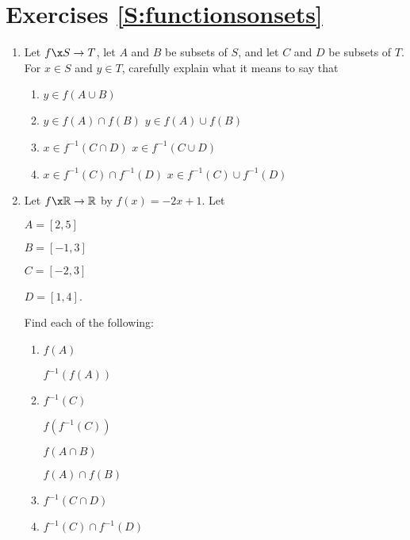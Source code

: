 \section*{Exercises \ref{S:functionsonsets}}

\begin{enumerate}
\item Let $f\x S \to T$, let $A$ and $B$ be subsets of $S$, and let $C$ and $D$ be subsets of $T$.  For $x \in S$ and $y \in T$, carefully explain what it means to say that \label{exer:sec91-1}

\begin{multicols}{2}
\begin{enumerate}
\yitem $y \in f ( A \cap B )$
\item $y \in f ( A \cup B )$
\item $y \in f ( A ) \cap f ( B )$
\yitem $y \in f ( A ) \cup f ( B )$
\item $x \in f^{-1} ( C \cap D )$
\yitem $x \in f^{-1} ( C \cup D )$
\item $x \in f^{-1} ( C ) \cap f^{-1} ( D )$
\yitem $x \in f^{-1} ( C ) \cup f^{-1} ( D )$
\end{enumerate}
\end{multicols}

\item Let $f\x \mathbb{R} \to \mathbb{R}$ by $f ( x ) = -2x + 1$.  Let 
\begin{multicols}{4}
$A = \left[ 2, 5 \right]$

$B = \left[ -1, 3 \right]$

$C = \left[ -2, 3 \right]$

$D = \left[ 1, 4 \right]$.
\end{multicols}

Find each of the following:  \label{exer:sec91-2}

\begin{multicols}{2}
\begin{enumerate}
\item $f ( A )$

\yitem $f^{-1} ( f ( A ) )$

\item $f^{-1} ( C )$

\yitem $f ( f^{-1} ( C ) )$

\yitem $f ( A \cap B )$

\yitem $f ( A ) \cap f ( B )$

\item $f^{-1} ( C \cap D )$

\item $f^{-1} ( C ) \cap f^{-1} ( D )$


\end{enumerate}
\end{multicols}
\end{enumerate}
